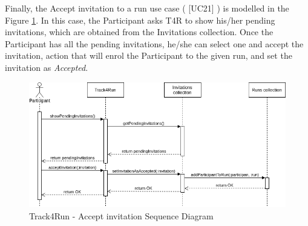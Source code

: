 \documentclass[hidelinks, 12pt]{report}
\newcommand\usecase[1]{ [UC#1] }
\begin{document}
	Finally, the Accept invitation to a run use case (\usecase{21}) is modelled in the Figure \ref{fig:t4r_accept_invitation}. In this case, the Participant asks T4R to show his/her pending invitations, which are obtained from the Invitations collection. Once the Participant has all the pending invitations, he/she can select one and accept the invitation, action that will enrol the Participant to the given run, and set the invitation as \textit{Accepted}.
	
	\begin{figure}[H]
		\centering
		\includegraphics[scale=0.6]{Diagrams/t4r_seq_accept_invitation.png}
		\caption[Track4Run - Accept invitation Sequence Diagram]{Track4Run - Accept invitation Sequence Diagram}
		\label{fig:t4r_accept_invitation}
	\end{figure}
	
	
\end{document}
